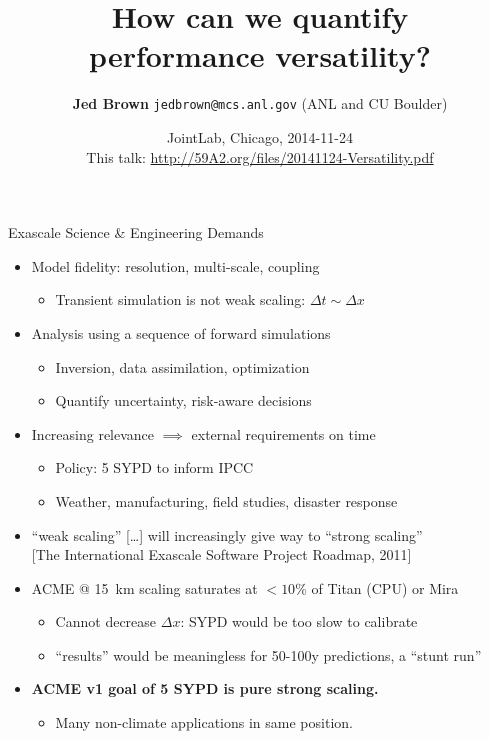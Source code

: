 \documentclass{beamer}
\title{How can we quantify \\ performance versatility?}
\author{{\bf Jed Brown} \texttt{jedbrown@mcs.anl.gov} (ANL and CU Boulder)}
\date{JointLab, Chicago, 2014-11-24 \\[1em]
{\small This talk: \url{http://59A2.org/files/20141124-Versatility.pdf}}}
\begin{document}
\lstset{language=C}
\normalem

\begin{frame}{Exascale Science \& Engineering Demands}
  \begin{itemize}
  \item Model fidelity: resolution, multi-scale, coupling
    \begin{itemize}
    \item Transient simulation is not weak scaling: $\Delta t \sim \Delta x$
    \end{itemize}
  \item Analysis using a sequence of forward simulations
    \begin{itemize}
    \item Inversion, data assimilation, optimization
    \item Quantify uncertainty, risk-aware decisions
    \end{itemize}
  \item Increasing relevance $\implies$ external requirements on time
    \begin{itemize}
    \item Policy: 5 SYPD to inform IPCC
    \item Weather, manufacturing, field studies, disaster response
    \end{itemize}
  \item ``weak scaling'' [\ldots] will increasingly give way to ``strong scaling''\\
    {\scriptsize [The International Exascale Software Project Roadmap, 2011]}
  \item ACME @ \SI{15}{\kilo\metre} scaling saturates at $<10\%$ of Titan (CPU) or Mira
    \begin{itemize}
    \item Cannot decrease $\Delta x$: SYPD would be too slow to calibrate
    \item ``results'' would be meaningless for 50-100y predictions, a ``stunt run''
    \end{itemize}
  \item \alert{\bf ACME v1 goal of 5 SYPD is pure strong scaling.}
    \begin{itemize}
    \item Many non-climate applications in same position.
    \end{itemize}
  \end{itemize}
\end{frame}
\end{document}
